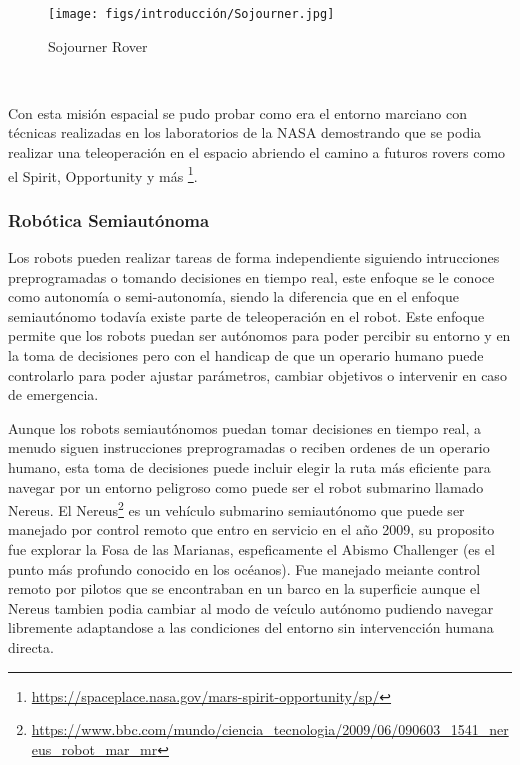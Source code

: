 \begin{figure} [H]
  \begin{center}
    \texttt{[image: figs/introducción/Sojourner.jpg]}
  \end{center}
  \caption{Sojourner Rover}
  \label{fig:Sojourner}
\end{figure}\

Con esta misión espacial se pudo probar como era el entorno marciano con técnicas realizadas en los laboratorios de la NASA demostrando que se podia realizar una teleoperación en 
el espacio abriendo el camino a futuros rovers como el Spirit, Opportunity y más \footnote{\url{https://spaceplace.nasa.gov/mars-spirit-opportunity/sp/}}. 

\subsubsection{Robótica Semiautónoma}
\label{sec:subseccion}
Los robots pueden realizar tareas de forma independiente siguiendo intrucciones preprogramadas o tomando decisiones en tiempo real, este enfoque se le conoce como autonomía o semi-autonomía, siendo la diferencia que en el enfoque semiautónomo todavía existe parte de teleoperación en el robot. Este enfoque permite que los robots puedan ser autónomos para poder
percibir su entorno y en la toma de decisiones pero con el handicap de que un operario humano puede controlarlo para poder ajustar parámetros, cambiar objetivos o intervenir 
en caso de emergencia. \newline

Aunque los robots semiautónomos puedan tomar decisiones en tiempo real, a menudo siguen instrucciones preprogramadas o reciben ordenes de un operario humano, esta toma de decisiones
puede incluir elegir la ruta más eficiente para navegar por un entorno peligroso como puede ser el robot submarino llamado Nereus. El Nereus\footnote{\url{https://www.bbc.com/mundo/ciencia_tecnologia/2009/06/090603_1541_nereus_robot_mar_mr}} 
es un vehículo submarino semiautónomo que puede ser manejado por control remoto que entro en servicio en el año 2009, su proposito fue explorar la Fosa de las Marianas, espeficamente el Abismo Challenger (es el punto más
profundo conocido en los océanos). Fue manejado meiante control remoto por pilotos que se encontraban en un barco en la superficie aunque el Nereus tambien podia cambiar al modo
de veículo autónomo pudiendo navegar libremente adaptandose a las condiciones del entorno sin intervencción humana directa. \newline

